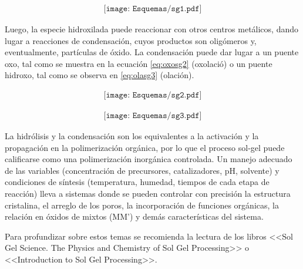 			 \begin{equation}
 				\begin{aligned}
 				\texttt{[image: Esquemas/sg1.pdf]}
 				\end{aligned}
 				\label{eq:hidrosg1}
 	 			\end{equation}

    	Luego, la especie hidroxilada puede reaccionar con otros centros metálicos, dando lugar a reacciones de condensación, cuyos productos son oligómeros y, eventualmente, partículas de óxido. La condensación puede dar lugar a un puente oxo, tal como se muestra en la ecuación \ref{eq:oxosg2} (oxolació) o un puente hidroxo, tal como se observa en \ref{eq:olasg3} (olación). 

			\begin{equation}
		    	\begin{aligned}
 	 	 		\texttt{[image: Esquemas/sg2.pdf]}
 	 	 		\end{aligned}
 	 	 		\label{eq:oxosg2}
 	 	 		\end{equation}

			\begin{equation}
 	 	 		\begin{aligned}
 	 	 		\texttt{[image: Esquemas/sg3.pdf]}
 	 	 		\label{eq:olasg3}
 	 	 		\end{aligned}
 	 	 		\end{equation}

	 La hidrólisis y la condensación son los equivalentes a la activación y la propagación en la polimerización orgánica, por lo que el proceso sol-gel puede calificarse como una polimerización inorgánica controlada. Un manejo adecuado de las variables (concentración de precursores, catalizadores, pH, solvente) y condiciones de síntesis (temperatura, humedad, tiempos de cada etapa de reacción) lleva a sistemas donde se pueden controlar con precisión  la estructura cristalina, el arreglo de los poros, la incorporación de funciones orgánicas, la relación en óxidos de mixtos (MM') y demás características del sistema.

	 Para profundizar sobre estos temas se recomienda la lectura de los libros <<Sol Gel Science. The Physics and Chemistry of Sol Gel Processing>>\cite{Wright2001} o <<Introduction to Sol Gel Processing>>. \cite{Pierre1998} 
	
